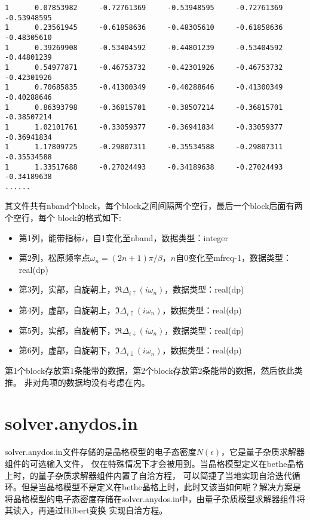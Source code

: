 \begin{lstlisting}[frame=single]
1      0.07853982     -0.72761369     -0.53948595     -0.72761369     -0.53948595
1      0.23561945     -0.61858636     -0.48305610     -0.61858636     -0.48305610
1      0.39269908     -0.53404592     -0.44801239     -0.53404592     -0.44801239
1      0.54977871     -0.46753732     -0.42301926     -0.46753732     -0.42301926
1      0.70685835     -0.41300349     -0.40288646     -0.41300349     -0.40288646
1      0.86393798     -0.36815701     -0.38507214     -0.36815701     -0.38507214
1      1.02101761     -0.33059377     -0.36941834     -0.33059377     -0.36941834
1      1.17809725     -0.29807311     -0.35534588     -0.29807311     -0.35534588
1      1.33517688     -0.27024493     -0.34189638     -0.27024493     -0.34189638
......
\end{lstlisting}
其文件共有nband个block，每个block之间间隔两个空行，最后一个block后面有两个空行，每个
block的格式如下:
\begin{itemize}
\item 第1列，能带指标$i$，自1变化至nband，数据类型：integer
\item 第2列，松原频率点$\omega_{n}=(2n+1)\pi/\beta$，$n$自0变化至mfreq-1，数据类型：real(dp)
\item 第3列，实部，自旋朝上，$\Re \Delta_{i\uparrow}(i\omega_{n})$，数据类型：real(dp)
\item 第4列，虚部，自旋朝上，$\Im \Delta_{i\uparrow}(i\omega_{n})$，数据类型：real(dp)
\item 第5列，实部，自旋朝下，$\Re \Delta_{i\downarrow}(i\omega_{n})$，数据类型：real(dp)
\item 第6列，虚部，自旋朝下，$\Im \Delta_{i\downarrow}(i\omega_{n})$，数据类型：real(dp)
\end{itemize}
第1个block存放第1条能带的数据，第2个block存放第2条能带的数据，然后依此类推。
非对角项的数据均没有考虑在内。

\section{solver.anydos.in}
\label{sec:sai}

solver.anydos.in文件存储的是晶格模型的电子态密度$N(\epsilon)$，它是量子杂质求解器组件的可选输入文件，
仅在特殊情况下才会被用到。当晶格模型定义在bethe晶格上时，{\iqist}的量子杂质求解器组件内置了自洽方程，
可以简捷了当地实现自洽迭代循环。但是当晶格模型不是定义在bethe晶格上时，此时又该当如何呢？解决方案是
将晶格模型的电子态密度存储在solver.anydos.in中，由量子杂质模型求解器组件将其读入，再通过Hilbert变换
实现自洽方程。

